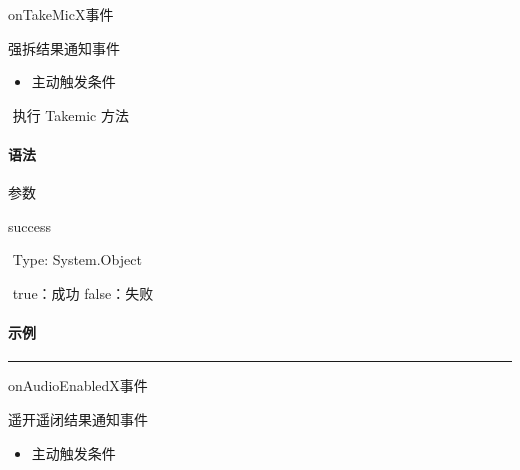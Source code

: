 \documentclass[letterpaper,10pt,english]{sphinxmanual}
\begin{document}
onTakeMicX事件



强拆结果通知事件
\begin{itemize}
\item {} 
主动触发条件

\end{itemize}

​ 执行 Takemic 方法


\paragraph{语法}
\label{\detokenize{csharp_activex:id149}}
%
\begin{sphinxVerbatim}[commandchars=\\\{\}]
  
\end{sphinxVerbatim}

参数

success

​ Type: System.Object

​ true：成功 false：失败


\paragraph{示例}
\label{\detokenize{csharp_activex:id150}}
%
\begin{sphinxVerbatim}[commandchars=\\\{\}]
    
      
\end{sphinxVerbatim}


\bigskip\hrule\bigskip




onAudioEnabledX事件



遥开遥闭结果通知事件
\begin{itemize}
\item {} 
主动触发条件

\end{itemize}
\end{document}
